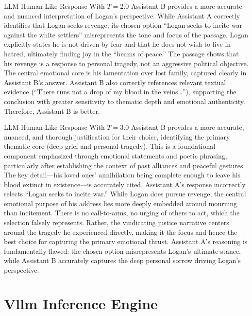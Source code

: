 \documentclass[11pt]{article}
\begin{document}
\begin{responsebox}{LLM Human-Like Response With $T=2.0$}
Assistant B provides a more accurate and nuanced interpretation of Logan's perspective. While
Assistant A correctly identifies that Logan seeks revenge, its chosen option ``Logan seeks to incite
war against the white settlers'' misrepresents the tone and focus of the passage. Logan explicitly
states he is not driven by fear and that he does not wish to live in hatred, ultimately finding joy
in the ``beams of peace.'' The passage shows that his revenge is a response to personal tragedy, not
an aggressive political objective. The central emotional core is his lamentation over lost family,
captured clearly in Assistant B's answer. Assistant B also correctly references relevant textual
evidence (``There runs not a drop of my blood in the veins\ldots''), supporting the conclusion with
greater sensitivity to thematic depth and emotional authenticity. Therefore, Assistant B is better.
\end{responsebox}

\begin{responsebox}{LLM Human-Like Response With $T=3.0$}
Assistant B provides a more accurate, nuanced, and thorough justification for their choice,
identifying the primary thematic core (deep grief and personal tragedy). This is a foundational
component emphasized through emotional statements and poetic phrasing, particularly after
establishing the context of past alliances and peaceful gestures.
The key detail---his loved ones' annihilation being complete enough to leave his blood extinct in
existence---is accurately cited.
Assistant A's response incorrectly selects ``Logan seeks to incite war.'' While Logan does pursue
revenge, the central emotional purpose of his address lies more deeply embedded around mourning
than incitement. There is no call-to-arms, no urging of others to act, which the selection falsely
represents. Rather, the vindicating justice narrative centers around the tragedy he experienced
directly, making it the focus and hence the best choice for capturing the primary emotional thrust.
Assistant A's reasoning is fundamentally flawed: the chosen option misrepresents Logan's ultimate
stance, while Assistant B accurately captures the deep personal sorrow driving Logan's perspective.
\end{responsebox}


\section{Vllm Inference Engine}
\end{document}
